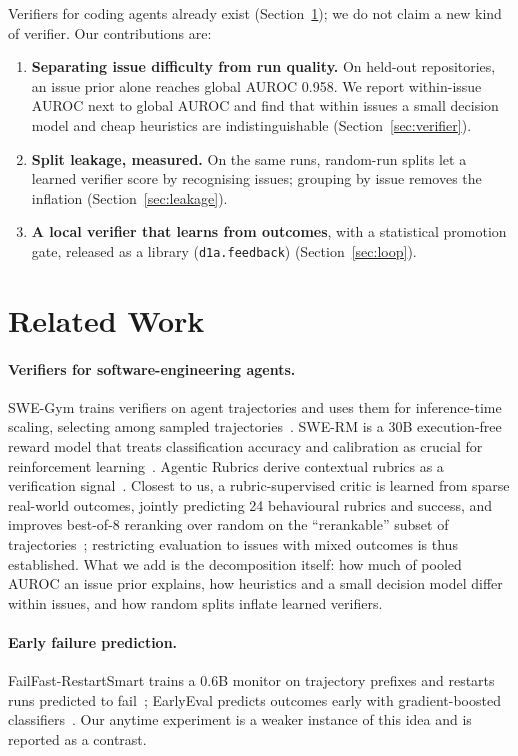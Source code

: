 \documentclass[11pt]{article}
\begin{document}
Verifiers for coding agents already exist (Section~\ref{sec:related}); we do not claim a new kind of verifier. Our contributions are:
\begin{enumerate}
\item \textbf{Separating issue difficulty from run quality.} On held-out repositories, an issue prior alone reaches global AUROC 0.958. We report
within-issue AUROC next to global AUROC and find that within issues a small decision model and cheap heuristics are indistinguishable (Section~\ref{sec:verifier}).
\item \textbf{Split leakage, measured.} On the same runs, random-run splits let a learned verifier score by recognising issues; grouping by issue removes
the inflation (Section~\ref{sec:leakage}).
\item \textbf{A local verifier that learns from outcomes}, with a statistical promotion gate, released as a library (\texttt{d1a.feedback})
(Section~\ref{sec:loop}).
\end{enumerate}

\section{Related Work}\label{sec:related}
\paragraph{Verifiers for software-engineering agents.} SWE-Gym trains verifiers on agent trajectories and uses them for inference-time scaling, selecting
among sampled trajectories~\cite{swegym}. SWE-RM is a 30B execution-free reward model that treats classification accuracy and calibration as crucial for
reinforcement learning~\cite{swerm}. Agentic Rubrics derive contextual rubrics as a verification signal~\cite{rubrics}. Closest to us, a rubric-supervised critic is learned from sparse
real-world outcomes, jointly predicting 24 behavioural rubrics and success, and improves best-of-8 reranking over random on the ``rerankable'' subset of
trajectories~\cite{critic}; restricting evaluation to issues with mixed outcomes is thus established. What we add is the decomposition itself: how much of
pooled AUROC an issue prior explains, how heuristics and a small decision model differ within issues, and how random splits inflate learned verifiers.

\paragraph{Early failure prediction.} FailFast-RestartSmart trains a 0.6B monitor on trajectory prefixes and restarts runs predicted to fail~\cite{failfast};
EarlyEval predicts outcomes early with gradient-boosted classifiers~\cite{earlyeval}. Our anytime experiment is a weaker instance of this idea and is
reported as a contrast.
\end{document}
